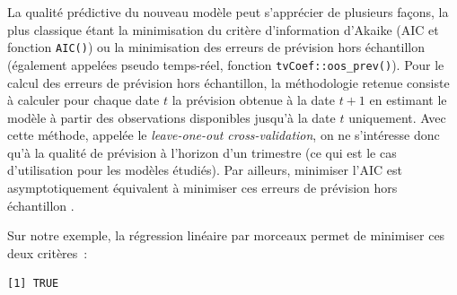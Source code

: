 \documentclass[
  a4paper,
  DIV=11,
  numbers=noendperiod,
  french]{scrartcl}
\newenvironment{Shaded}{\begin{snugshade}}{\end{snugshade}}
\newcommand{\AttributeTok}[1]{\textcolor[rgb]{0.40,0.45,0.13}{#1}}
\newcommand{\CommentTok}[1]{\textcolor[rgb]{0.37,0.37,0.37}{#1}}
\newcommand{\DecValTok}[1]{\textcolor[rgb]{0.68,0.00,0.00}{#1}}
\newcommand{\FunctionTok}[1]{\textcolor[rgb]{0.28,0.35,0.67}{#1}}
\newcommand{\NormalTok}[1]{\textcolor[rgb]{0.00,0.23,0.31}{#1}}
\newcommand{\OtherTok}[1]{\textcolor[rgb]{0.00,0.23,0.31}{#1}}
\newcommand{\SpecialCharTok}[1]{\textcolor[rgb]{0.37,0.37,0.37}{#1}}
\newcommand\1{{\mathds 1}}
\theoremstyle{remark}
\begin{document}
La qualité prédictive du nouveau modèle peut s'apprécier de plusieurs
façons, la plus classique étant la minimisation du critère d'information
d'Akaike (AIC et fonction \texttt{AIC()}) ou la minimisation des erreurs
de prévision hors échantillon (également appelées pseudo temps-réel,
fonction \texttt{tvCoef::oos\_prev()}). Pour le calcul des erreurs de
prévision hors échantillon, la méthodologie retenue consiste à calculer
pour chaque date \(t\) la prévision obtenue à la date \(t+1\) en
estimant le modèle à partir des observations disponibles jusqu'à la date
\(t\) uniquement. Avec cette méthode, appelée le \emph{leave-one-out
cross-validation}, on ne s'intéresse donc qu'à la qualité de prévision à
l'horizon d'un trimestre (ce qui est le cas d'utilisation pour les
modèles étudiés). Par ailleurs, minimiser l'AIC est asymptotiquement
équivalent à minimiser ces erreurs de prévision hors échantillon
\autocite{AIC}.

Sur notre exemple, la régression linéaire par morceaux permet de
minimiser ces deux critères~:

\begin{Shaded}
\end{Shaded}

\begin{verbatim}
[1] TRUE
\end{verbatim}

\begin{Shaded}
\end{Shaded}
\end{document}
